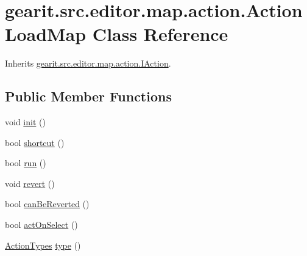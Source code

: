 \hypertarget{classgearit_1_1src_1_1editor_1_1map_1_1action_1_1_action_load_map}{\section{gearit.\+src.\+editor.\+map.\+action.\+Action\+Load\+Map Class Reference}
\label{classgearit_1_1src_1_1editor_1_1map_1_1action_1_1_action_load_map}
}


Inherits \hyperlink{interfacegearit_1_1src_1_1editor_1_1map_1_1action_1_1_i_action}{gearit.\+src.\+editor.\+map.\+action.\+I\+Action}.

\subsection*{Public Member Functions}
\begin{DoxyCompactItemize}
\item 
void \hyperlink{classgearit_1_1src_1_1editor_1_1map_1_1action_1_1_action_load_map_a59154521f754314e4db3d67a984e057b}{init} ()
\item 
bool \hyperlink{classgearit_1_1src_1_1editor_1_1map_1_1action_1_1_action_load_map_af122d3620a9732f317e230a765bf4061}{shortcut} ()
\item 
bool \hyperlink{classgearit_1_1src_1_1editor_1_1map_1_1action_1_1_action_load_map_a775e70d389c9766e87ad0203f250ff3e}{run} ()
\item 
void \hyperlink{classgearit_1_1src_1_1editor_1_1map_1_1action_1_1_action_load_map_a0866273c37bedf2c4c4a1067c25d4664}{revert} ()
\item 
bool \hyperlink{classgearit_1_1src_1_1editor_1_1map_1_1action_1_1_action_load_map_a8f98451387e78fde0c63eea64092b373}{can\+Be\+Reverted} ()
\item 
bool \hyperlink{classgearit_1_1src_1_1editor_1_1map_1_1action_1_1_action_load_map_ab62d1cfcd953af8a5d853e8ddb30b606}{act\+On\+Select} ()
\item 
\hyperlink{namespacegearit_1_1src_1_1editor_1_1map_1_1action_af036712a7d960b13d1e31954e65c00e3}{Action\+Types} \hyperlink{classgearit_1_1src_1_1editor_1_1map_1_1action_1_1_action_load_map_ab1e0034f37ab8ad1db5dfb0b8c51aaef}{type} ()
\end{DoxyCompactItemize}


